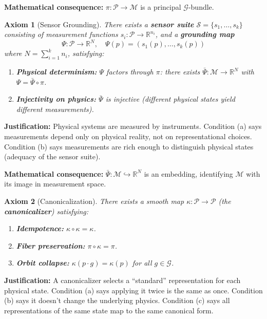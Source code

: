 \documentclass[11pt]{article}
\newtheorem{axiom}{Axiom}
\begin{document}
\textbf{Mathematical consequence:} $\pi : \mathcal{P} \to \mathcal{M}$ is a principal $\mathcal{G}$-bundle.

\begin{axiom}[Sensor Grounding]
There exists a \textbf{sensor suite} $\mathcal{S} = \{s_1, \ldots, s_k\}$ consisting of
measurement functions $s_i : \mathcal{P} \to \mathbb{R}^{n_i}$, and a \textbf{grounding map}
\[
\Psi : \mathcal{P} \to \mathbb{R}^N, \quad \Psi(p) = (s_1(p), \ldots, s_k(p))
\]
where $N = \sum_{i=1}^{k} n_i$, satisfying:
\begin{enumerate}
    \item[(a)] \textbf{Physical determinism:} $\Psi$ factors through $\pi$: there exists $\bar{\Psi} : \mathcal{M} \to \mathbb{R}^N$ with $\Psi = \bar{\Psi} \circ \pi$.
    \item[(b)] \textbf{Injectivity on physics:} $\bar{\Psi}$ is injective (different physical states yield different measurements).
\end{enumerate}
\end{axiom}

\textbf{Justification:} Physical systems are measured by instruments. Condition (a) says measurements depend only on physical reality, not on representational choices. Condition (b) says
measurements are rich enough to distinguish physical states (adequacy of the sensor suite).

\textbf{Mathematical consequence:} $\bar{\Psi} : \mathcal{M} \hookrightarrow \mathbb{R}^N$ is an embedding, identifying $\mathcal{M}$ with its
image in measurement space.

\begin{axiom}[Canonicalization]
There exists a smooth map $\kappa : \mathcal{P} \to \mathcal{P}$ (the \textbf{canonicalizer})
satisfying:
\begin{enumerate}
    \item[(a)] \textbf{Idempotence:} $\kappa \circ \kappa = \kappa$.
    \item[(b)] \textbf{Fiber preservation:} $\pi \circ \kappa = \pi$.
    \item[(c)] \textbf{Orbit collapse:} $\kappa(p \cdot g) = \kappa(p)$ for all $g \in \mathcal{G}$.
\end{enumerate}
\end{axiom}

\textbf{Justification:} A canonicalizer selects a ``standard'' representation for each physical state.
Condition (a) says applying it twice is the same as once. Condition (b) says it doesn't change
the underlying physics. Condition (c) says all representations of the same state map to the
same canonical form.
\end{document}
